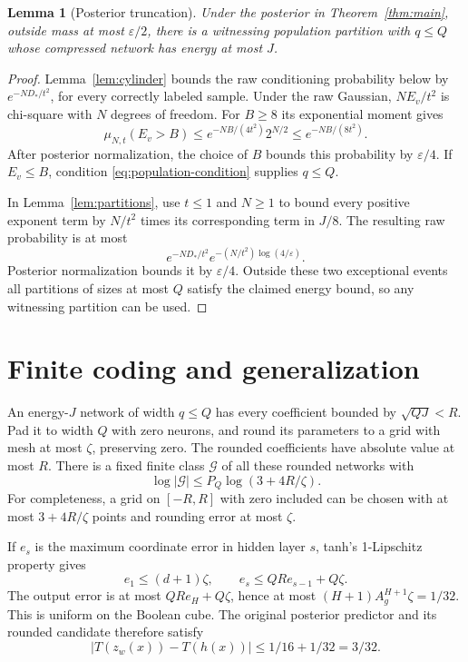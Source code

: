 \documentclass[11pt]{article}
\newtheorem{lemma}[theorem]{Lemma}
\begin{document}
\begin{lemma}[Posterior truncation]\label{lem:truncation}
Under the posterior in Theorem~\ref{thm:main}, outside mass at most
$\varepsilon/2$, there is a witnessing population partition with
$q\le Q$ whose compressed network has energy at most $J$.
\end{lemma}
\begin{proof}
Lemma~\ref{lem:cylinder} bounds the raw conditioning probability below by
$e^{-ND_*/t^2}$, for every correctly labeled sample.
Under the raw Gaussian, $NE_v/t^2$ is chi-square with $N$ degrees of freedom.
For $B\ge8$ its exponential moment gives
\[
 \mu_{N,t}(E_v>B)\le e^{-NB/(4t^2)}2^{N/2}
                     \le e^{-NB/(8t^2)}.
\]
After posterior normalization, the choice of $B$ bounds this probability
by $\varepsilon/4$. If $E_v\le B$, condition
\eqref{eq:population-condition} supplies $q\le Q$.

In Lemma~\ref{lem:partitions}, use $t\le1$ and $N\ge1$ to bound every
positive exponent term by $N/t^2$ times its corresponding term in $J/8$.
The resulting raw probability is at most
\[
 e^{-ND_*/t^2}e^{-(N/t^2)\log(4/\varepsilon)}.
\]
Posterior normalization bounds it by $\varepsilon/4$. Outside these two
exceptional events all partitions of sizes at most $Q$ satisfy the claimed
energy bound, so any witnessing partition can be used.
\end{proof}

\section{Finite coding and generalization}

An energy-$J$ network of width $q\le Q$ has every coefficient bounded by
$\sqrt{QJ}<R$. Pad it to width $Q$ with zero neurons, and round its
parameters to a grid with mesh at most $\zeta$, preserving zero. The rounded
coefficients have absolute value at most $R$. There is a fixed finite class
$\mathcal G$ of all these rounded networks with
\begin{equation}\label{eq:code}
 \log|\mathcal G|\le P_Q\log(3+4R/\zeta).
\end{equation}
For completeness, a grid on $[-R,R]$ with zero included can be chosen with
at most $3+4R/\zeta$ points and rounding error at most $\zeta$.

If $e_s$ is the maximum coordinate error in hidden layer $s$, tanh's
1-Lipschitz property gives
\[
 e_1\le(d+1)\zeta,\qquad e_s\le QR e_{s-1}+Q\zeta.
\]
The output error is at most $QR e_H+Q\zeta$, hence at most
$(H+1)A_g^{H+1}\zeta=1/32$. This is uniform on the Boolean cube.
The original posterior predictor and its rounded candidate therefore
satisfy
\begin{equation}\label{eq:approximation}
 |T(z_w(x))-T(h(x))|\le1/16+1/32=3/32.
\end{equation}
\end{document}
